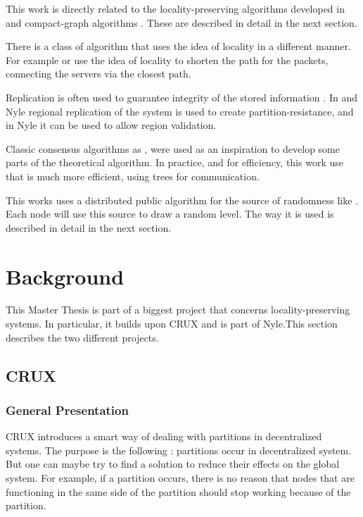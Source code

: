 \documentclass[a4paper,11pt,oneside]{report}
\begin{document}
This work is directly related to the locality-preserving algorithms developed
in \cite{CRUX} and compact-graph algorithms \cite{approximation oracle}. These
are described in detail in the next section. 

There is a class of algorithm that uses the idea of locality in a different
manner. For example \cite{Geo-DNS} or \cite{IP Anycast} use the idea of
locality to shorten the path for the packets, connecting the servers via the
closest path.

Replication is often used to guarantee integrity of the stored information
\cite{find-paper-replication}. In \cite{CRUX} and Nyle regional replication of
the system is used to create partition-resistance, and in Nyle it can be used
to allow region validation.

Classic consensus algorithms as \cite{Paxos}, \cite{PBFT} were used as an
inspiration to develop some parts of the theoretical algorithm. In practice,
and for efficiency, this work use \cite{BlsCoSi} that is much more efficient,
using trees for communication.  

This works uses a distributed public algorithm for the source of randomness
like \cite{RandHound}. Each node will use this source to draw a random level.
The way it is used is described in detail in the next section. 


\chapter{Background}


This Master Thesis is part of a biggest project that concerns
locality-preserving systems. In particular, it builds upon
CRUX\cite{basescu2014crux} and is part of Nyle.This section describes the two
different projects. 

\section{CRUX}

\subsection{General Presentation} CRUX introduces a smart way of dealing with
partitions in decentralized systems. The purpose is the following : partitions
occur in decentralized system. But one can maybe try to find a solution to
reduce their effects on the global system. For example, if a partition occurs,
there is no reason that nodes that are functioning in the same side of the
partition should stop working because of the partition. 
\end{document}
